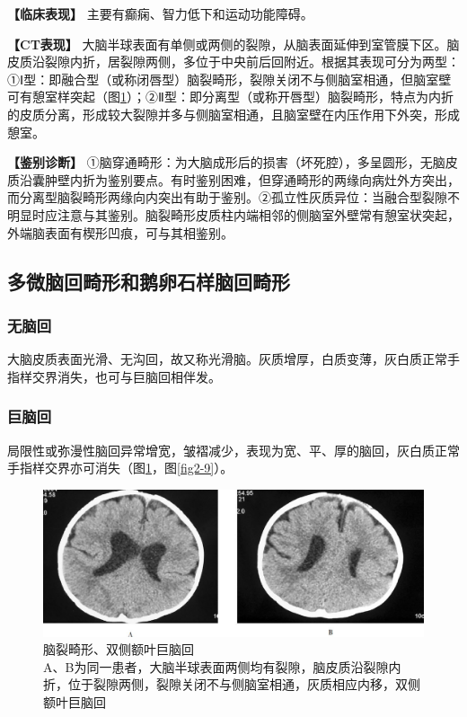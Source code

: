 \textbf{【临床表现】} 主要有癫痫、智力低下和运动功能障碍。

\textbf{【CT表现】}
大脑半球表面有单侧或两侧的裂隙，从脑表面延伸到室管膜下区。脑皮质沿裂隙内折，居裂隙两侧，多位于中央前后回附近。根据其表现可分为两型：①Ⅰ型：即融合型（或称闭唇型）脑裂畸形，裂隙关闭不与侧脑室相通，但脑室壁可有憩室样突起（图\ref{fig2-8}）；②Ⅱ型：即分离型（或称开唇型）脑裂畸形，特点为内折的皮质分离，形成较大裂隙并多与侧脑室相通，且脑室壁在内压作用下外突，形成憩室。

\textbf{【鉴别诊断】}
①脑穿通畸形：为大脑成形后的损害（坏死腔），多呈圆形，无脑皮质沿囊肿壁内折为鉴别要点。有时鉴别困难，但穿通畸形的两缘向病灶外方突出，而分离型脑裂畸形两缘向内突出有助于鉴别。②孤立性灰质异位：当融合型裂隙不明显时应注意与其鉴别。脑裂畸形皮质柱内端相邻的侧脑室外壁常有憩室状突起，外端脑表面有楔形凹痕，可与其相鉴别。

\subsection{多微脑回畸形和鹅卵石样脑回畸形}

\subsubsection{无脑回}

大脑皮质表面光滑、无沟回，故又称光滑脑。灰质增厚，白质变薄，灰白质正常手指样交界消失，也可与巨脑回相伴发。

\subsubsection{巨脑回}

局限性或弥漫性脑回异常增宽，皱褶减少，表现为宽、平、厚的脑回，灰白质正常手指样交界亦可消失（图\ref{fig2-8}，图\ref{fig2-9}）。

\begin{figure}[!htbp]
 {\centering
 \includegraphics[width=.7\textwidth,height=\textheight,keepaspectratio]{./images/Image00024.jpg}
 \captionsetup{justification=centering}
 \caption{脑裂畸形、双侧额叶巨脑回\\{\small  A、B为同一患者，大脑半球表面两侧均有裂隙，脑皮质沿裂隙内折，位于裂隙两侧，裂隙关闭不与侧脑室相通，灰质相应内移，双侧额叶巨脑回}}
 \label{fig2-8}}
  \end{figure} 



